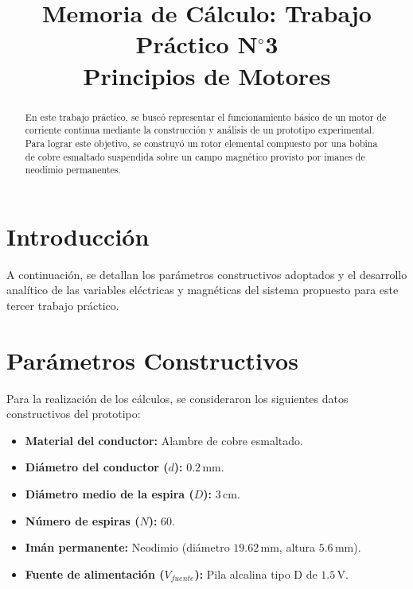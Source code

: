 \documentclass[conference, a4paper]{IEEEtran}
\begin{document}
\title{Memoria de Cálculo: Trabajo Práctico N$^\circ$3 \\ Principios de Motores}

\author{
}

\maketitle

\begin{abstract}
En este trabajo práctico, se buscó representar el funcionamiento básico de un motor de corriente continua mediante la construcción y análisis de un prototipo experimental. Para lograr este objetivo, se construyó un rotor elemental compuesto por una bobina de cobre esmaltado suspendida sobre un campo magnético provisto por imanes de neodimio permanentes. 
\end{abstract}

\section{Introducción}
A continuación, se detallan los parámetros constructivos adoptados y el desarrollo analítico de las variables eléctricas y magnéticas del sistema propuesto para este tercer trabajo práctico.

\section{Parámetros Constructivos}
Para la realización de los cálculos, se consideraron los siguientes datos constructivos del prototipo:
\begin{itemize}
    \item \textbf{Material del conductor:} Alambre de cobre esmaltado.
    \item \textbf{Diámetro del conductor ($d$):} $0.2 \, \text{mm}$.
    \item \textbf{Diámetro medio de la espira ($D$):} $3 \, \text{cm}$.
    \item \textbf{Número de espiras ($N$):} $60$.
    \item \textbf{Imán permanente:} Neodimio (diámetro $19.62 \, \text{mm}$, altura $5.6 \, \text{mm}$).
    \item \textbf{Fuente de alimentación ($V_{fuente}$):} Pila alcalina tipo D de $1.5 \, \text{V}$.
\end{itemize}
\end{document}
